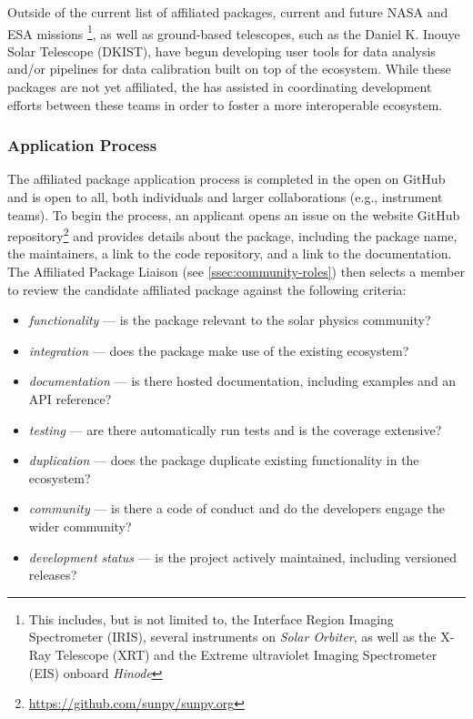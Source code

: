 Outside of the current list of affiliated packages, current and future NASA and ESA missions \footnote{This includes, but is not limited to, the Interface Region Imaging Spectrometer (IRIS), several instruments on \textit{Solar Orbiter}, as well as the X-Ray Telescope (XRT) and the Extreme ultraviolet Imaging Spectrometer (EIS) onboard \textit{Hinode}}, as well as ground-based telescopes, such as the Daniel K. Inouye Solar Telescope (DKIST), have begun developing user tools for data analysis and/or pipelines for data calibration built on top of the \sunpy ecosystem.
While these packages are not yet affiliated, the \sunpyproj has assisted in coordinating development efforts between these teams in order to foster a more interoperable ecosystem.

\subsubsection{Application Process}
\label{sssec:application-process}

The affiliated package application process is completed in the open on GitHub and is open to all, both individuals and larger collaborations (e.g., instrument teams).
To begin the process, an applicant opens an issue on the \sunpyproj website GitHub repository\footnote{\url{https://github.com/sunpy/sunpy.org}} and provides details about the package, including the package name, the maintainers, a link to the code repository, and a link to the documentation.
The Affiliated Package Liaison (see \autoref{ssec:community-roles}) then selects a \sunpyproj member to review the candidate affiliated package against the following criteria:

\begin{itemize}
    \item \textit{functionality} --- is the package relevant to the solar physics community?
    \item \textit{integration} --- does the package make use of the existing ecosystem?
    \item \textit{documentation} --- is there hosted documentation, including examples and an API reference?
    \item \textit{testing} --- are there automatically run tests and is the coverage extensive?
    \item \textit{duplication} --- does the package duplicate existing functionality in the ecosystem?
    \item \textit{community} --- is there a code of conduct and do the developers engage the wider community?
    \item \textit{development status} --- is the project actively maintained, including versioned releases?
\end{itemize}

